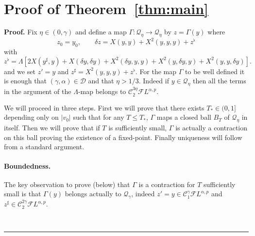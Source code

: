 \documentclass[a4paper,11pt,reqno]{article}
\newcommand{\der}{\delta}
\newcommand{\CC}{\mathcal{C}}
\newcommand{\DD}{\mathcal{D}}
\newcommand{\FF}{\mathcal{F}}
\newcommand{\QQ}{\mathcal{Q}}
\newenvironment{proof}[1][Proof]{\textbf{#1.} }{\ \rule{0.5em}{0.5em}}
\begin{document}
\section{Proof of Theorem~\ref{thm:main}}
\label{proof:thm:main}
\begin{proof} Fix $\eta \in (0,\gamma)$ and
 define
a map $\Gamma: \QQ_\eta \to \QQ_\eta$ by $z = \Gamma(y)$ where
\begin{equation}
  \label{eq:gamma}
z_0 = y_0, \qquad \der z = X(y,y) + X^2(y,y,y) + z^\flat
\end{equation}
with
$$
z^\flat = \Lambda[ 2 X(y^\sharp,y) 
+ X(\der y,\der y) 
 + X^2(\der y,y,y) +
X^2(y,\der y,y) + X^2( y,y,\der y)   ].
$$
and we set $z' = y$ and $z^\sharp = X^2(y,y,y) + z^\flat$. For the map
$\Gamma$ to be well defined it is enough that $(\gamma,\alpha) \in
\DD$ and that $\eta > 1/3$. Indeed if $y \in \QQ_\eta$ then all the
terms in the argument of the $\Lambda$-map belongs to
$\CC_2^{3\eta} \FF L^{\alpha,p}$.
 
We will proceed in three steps. First we will prove that there exists
$T_*\in(0,1]$  depending only on $|v_0|$ such that for any $T\le T_* $, $\Gamma$ maps a closed ball $B_T$ of $\QQ_{\eta}$ in
itself. Then we will prove that if $T$ is sufficiently small, $\Gamma$
is actually a contraction on this ball proving the existence  of a
fixed-point. Finally uniqueness will follow from a standard argument.


\paragraph{Boundedness.}
The key observation to prove (below) that $\Gamma$
is a contraction for $T$ sufficiently small is that $\Gamma(y)$
belongs actually to $\QQ_\gamma$, indeed $z' = y \in \CC_1^\gamma
 \FF L^{\alpha,p}$ and $z^\sharp \in \CC_2^{2\gamma}  \FF L^{\alpha,p}$. 


\end{proof}
\end{document}
